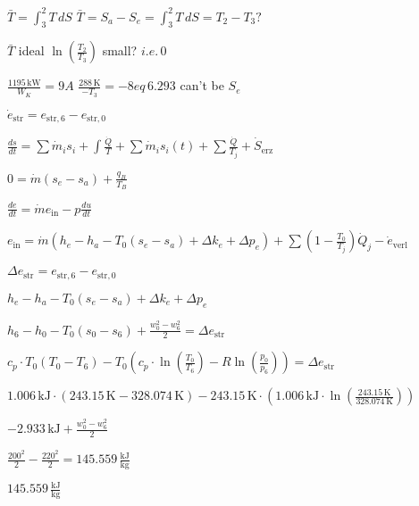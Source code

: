 \( \bar{T} = \int_{3}^{2} T \, dS \)  
\( \bar{T} = S_{a} - S_{e} = \int_{3}^{2} T \, dS = T_{2} - T_{3}? \)  

\( \bar{T} \) ideal \( \ln \left( \frac{T_{2}}{T_{3}} \right) \) small? \( i.e. \, 0 \)  

\( \frac{1195 \, \text{kW}}{W_{K}} = 9A \)  
\( \frac{288 \, \text{K}}{-T_{3}} = -8eq \, 6.293 \)  
can't be \( S_{e} \)

\( \dot{e}_{\text{str}} = e_{\text{str},6} - e_{\text{str},0} \)  

\( \frac{ds}{dt} = \sum \dot{m}_i s_i + \int \frac{\dot{Q}}{T} + \sum \dot{m}_i s_i(t) + \sum \frac{\dot{Q}}{T_j} + \dot{S}_{\text{erz}} \)  

\( 0 = \dot{m} (s_e - s_a) + \frac{q_B}{T_B} \)  

\( \frac{de}{dt} = \dot{m} e_{\text{in}} - p \frac{du}{dt} \)  

\( e_{\text{in}} = \dot{m} (h_e - h_a - T_0 (s_e - s_a) + \Delta k_e + \Delta p_e) + \sum (1 - \frac{T_0}{T_j}) \dot{Q}_j - \dot{e}_{\text{verl}} \)  

\( \Delta e_{\text{str}} = e_{\text{str},6} - e_{\text{str},0} \)  

\( h_e - h_a - T_0 (s_e - s_a) + \Delta k_e + \Delta p_e \)  

\( h_6 - h_0 - T_0 (s_0 - s_6) + \frac{w_0^2 - w_6^2}{2} = \Delta e_{\text{str}} \)  

\( c_p \cdot T_0 (T_0 - T_6) - T_0 (c_p \cdot \ln (\frac{T_0}{T_6}) - R \ln (\frac{p_0}{p_6})) = \Delta e_{\text{str}} \)  

\( 1.006 \, \text{kJ} \cdot \left( 243.15 \, \text{K} - 328.074 \, \text{K} \right) - 243.15 \, \text{K} \cdot \left( 1.006 \, \text{kJ} \cdot \ln \left( \frac{243.15 \, \text{K}}{328.074 \, \text{K}} \right) \right) \)  

\( -2.933 \, \text{kJ} + \frac{w_0^2 - w_6^2}{2} \)  

\( \frac{200^2}{2} - \frac{220^2}{2} = 145.559 \, \frac{\text{kJ}}{\text{kg}} \)  

\( 145.559 \, \frac{\text{kJ}}{\text{kg}} \)